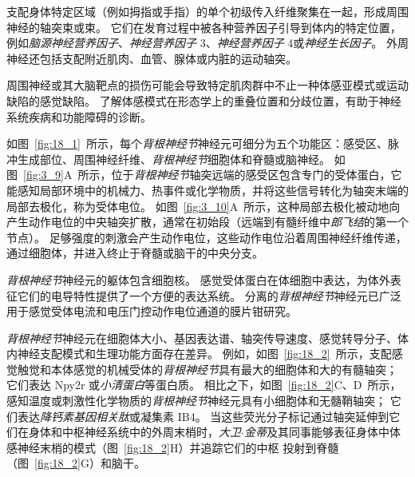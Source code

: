 支配身体特定区域（例如拇指或手指）的单个初级传入纤维聚集在一起，形成周围神经的轴突束或束。
它们在发育过程中被各种营养因子引导到体内的特定位置，例如\textit{脑源神经营养因子}、\textit{神经营养因子} 3、\textit{神经营养因子} 4或\textit{神经生长因子}。
外周神经还包括支配附近肌肉、血管、腺体或内脏的运动轴突。


周围神经或其大脑靶点的损伤可能会导致特定肌肉群中不止一种体感亚模式或运动缺陷的感觉缺陷。
了解体感模式在形态学上的重叠位置和分歧位置，有助于神经系统疾病和功能障碍的诊断。


如图~\ref{fig:18_1}~所示，每个\textit{背根神经节}神经元可细分为五个功能区：感受区、脉冲生成部位、周围神经纤维、\textit{背根神经节}细胞体和脊髓或脑神经。
如图~\ref{fig:3_9}A~所示，位于\textit{背根神经节}轴突远端的感受区包含专门的受体蛋白，它能感知局部环境中的机械力、热事件或化学物质，并将这些信号转化为轴突末端的局部去极化，称为受体电位。
如图~\ref{fig:3_10}A~所示，这种局部去极化被动地向产生动作电位的中央轴突扩散，通常在初始段（远端到有髓纤维中\textit{郎飞结}的第一个节点）。
足够强度的刺激会产生动作电位，这些动作电位沿着周围神经纤维传递，通过细胞体，并进入终止于脊髓或脑干的中央分支。


\textit{背根神经节}神经元的躯体包含细胞核。 
感觉受体蛋白在体细胞中表达，为体外表征它们的电导特性提供了一个方便的表达系统。 
分离的\textit{背根神经节}神经元已广泛用于感觉受体电流和电压门控动作电位通道的膜片钳研究。


\textit{背根神经节}神经元在细胞体大小、基因表达谱、轴突传导速度、感觉转导分子、体内神经支配模式和生理功能方面存在差异。 
例如，如图~\ref{fig:18_2}~所示，支配感觉触觉和本体感觉的机械受体的\textit{背根神经节}具有最大的细胞体和大的有髓轴突；
它们表达 Npy2r 或\textit{小清蛋白}等蛋白质。
相比之下，如图~\ref{fig:18_2}C、D~所示，感知温度或刺激性化学物质的\textit{背根神经节}神经元具有小细胞体和无髓鞘轴突；
它们表达\textit{降钙素基因相关肽}或凝集素 IB4。 
当这些荧光分子标记通过轴突延伸到它们在身体和中枢神经系统中的外周末梢时，\textit{大卫$\cdot$金蒂}及其同事能够表征身体中体感神经末梢的模式（图~\ref{fig:18_2}H）并追踪它们的中枢 投射到脊髓（图~\ref{fig:18_2}G）和脑干。

